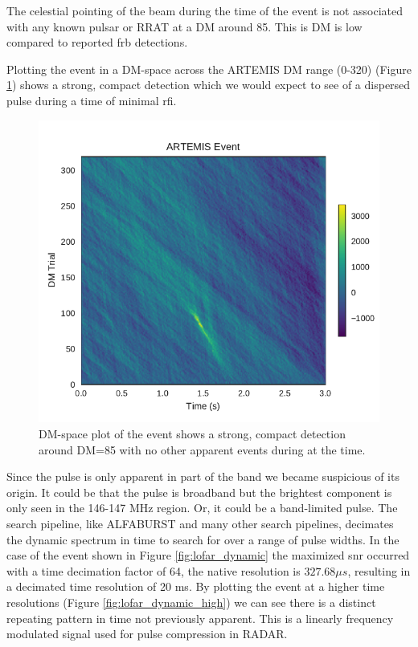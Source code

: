 \documentclass[a4paper,fleqn,usenatbib]{mnras}
\begin{document}
The celestial pointing of the beam during the time of the event is not
associated with any known pulsar or RRAT at a DM around 85. This is DM is low
compared to reported \gls{frb} detections.

Plotting the event in a DM-space across the ARTEMIS DM range (0-320) (Figure
\ref{fig:lofar_dm_time}) shows a strong, compact detection which we would expect
to see of a dispersed pulse during a time of minimal \gls{rfi}.

\begin{figure}
    \includegraphics[width=1.0\linewidth]{figures/LOFAR_dm_time.pdf}
    \caption{DM-space plot of the event shows a strong, compact detection around
    DM=85 with no other apparent events during at the time.
    }
    \label{fig:lofar_dm_time}
\end{figure}

Since the pulse is only apparent in part of the band we became suspicious of its
origin. It could be that the pulse is broadband but the brightest component is
only seen in the 146-147 MHz region. Or, it could be a band-limited pulse.  The
search pipeline, like ALFABURST and many other search pipelines, decimates the
dynamic spectrum in time to search for over a range of pulse widths. In the case
of the event shown in Figure \ref{fig:lofar_dynamic} the maximized \gls{snr}
occurred with a time decimation factor of 64, the native resolution is $327.68
\mu s$, resulting in a decimated time resolution of 20 ms. By plotting the event
at a higher time resolutions (Figure \ref{fig:lofar_dynamic_high}) we can see
there is a distinct repeating pattern in time not previously apparent. This is a
linearly frequency modulated signal used for pulse compression in RADAR.
\end{document}
